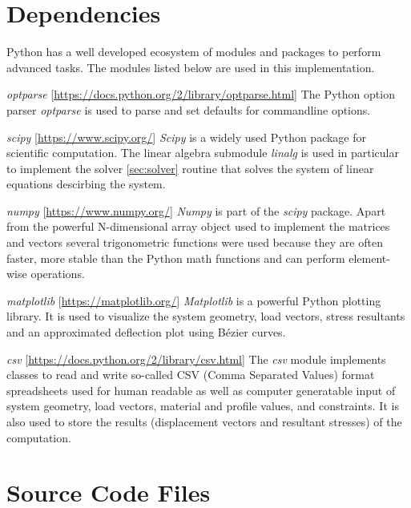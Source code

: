 \section{Dependencies}
\label{sec:depend}

Python has a well developed ecosystem of modules and packages to perform advanced tasks.
The modules listed below are used in this implementation.
\bigskip
 
\textit{optparse} [\url{https://docs.python.org/2/library/optparse.html}] \linebreak
The Python option parser \textit{optparse} is used to parse and set defaults for commandline options.
\bigskip

\textit{scipy} [\url{https://www.scipy.org/}]\linebreak
\textit{Scipy} is a widely used Python package for scientific computation. The linear algebra submodule \textit{linalg} is used in particular to implement the solver \ref{sec:solver} routine that solves the system of linear equations descirbing the system.
\bigskip

\textit{numpy} [\url{https://www.numpy.org/}]\linebreak
\textit{Numpy} is part of the \textit{scipy} package. Apart from the powerful N-dimensional array object used to implement the matrices and vectors several trigonometric functions were used because they are often faster, more stable than the Python math functions and can perform element-wise operations.
\bigskip

\textit{matplotlib} [\url{https://matplotlib.org/}]\linebreak
\textit{Matplotlib} is a powerful Python plotting library. It is used to visualize the system geometry, load vectors, stress resultants and an approximated deflection plot using B\'{e}zier curves.
\bigskip

\textit{csv} [\url{https://docs.python.org/2/library/csv.html}]\linebreak
The \textit{csv} module implements classes to read and write so-called CSV (Comma Separated Values) format spreadsheets used for human readable as well as computer generatable input of system geometry, load vectors, material and profile values, and constraints.
It is also used to store the results (displacement vectors and resultant stresses) of the computation.

\pagebreak

\section{Source Code Files}
\label{sec:srcfiles}

